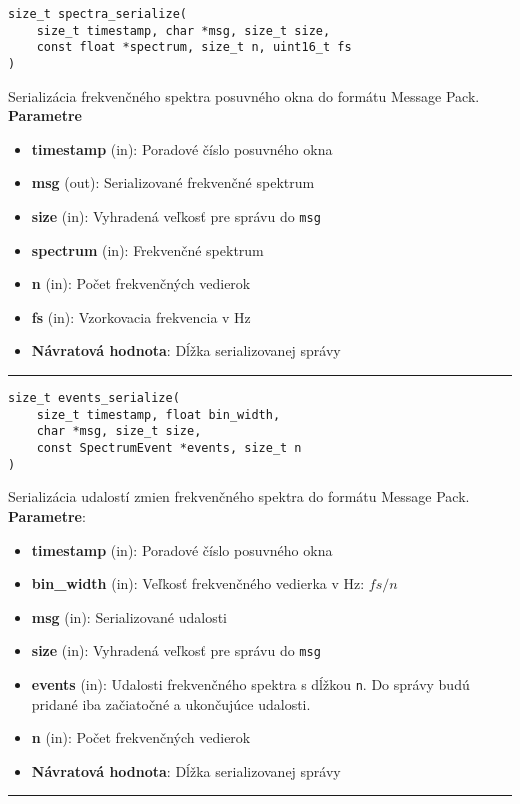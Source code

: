 \begin{lstlisting}[style=docs]
size_t spectra_serialize(
	size_t timestamp, char *msg, size_t size, 
	const float *spectrum, size_t n, uint16_t fs
)
\end{lstlisting}
Serializácia frekvenčného spektra posuvného okna do formátu Message Pack. \\ 
\textbf{Parametre}
\begin{itemize}[noitemsep, topsep=0pt]
 	\item \textbf{timestamp} (in): Poradové číslo posuvného okna
 	\item \textbf{msg} (out): Serializované frekvenčné spektrum
 	\item \textbf{size} (in): Vyhradená veľkosť pre správu do \verb|msg|
 	\item \textbf{spectrum} (in): Frekvenčné spektrum
	\item \textbf{n} (in): Počet frekvenčných vedierok
	\item \textbf{fs} (in): Vzorkovacia frekvencia v Hz
 	\item \textbf{Návratová hodnota}: Dĺžka serializovanej správy
\end{itemize}
\bigbreak
\hrule

\begin{lstlisting}[style=docs]
size_t events_serialize(
	size_t timestamp, float bin_width, 
	char *msg, size_t size, 
	const SpectrumEvent *events, size_t n
)
\end{lstlisting}
Serializácia udalostí zmien frekvenčného spektra do formátu Message Pack. \\ 
\textbf{Parametre}:
\begin{itemize}[noitemsep, topsep=0pt]
	\item \textbf{timestamp} (in): Poradové číslo posuvného okna
	\item \textbf{bin\_width} (in): Veľkosť frekvenčného vedierka v Hz: $fs / n$
	\item \textbf{msg} (in): Serializované udalosti
	\item \textbf{size} (in): Vyhradená veľkosť pre správu do  \verb|msg|
	\item \textbf{events} (in): Udalosti frekvenčného spektra s dĺžkou  \verb|n|. 
	Do správy budú pridané iba začiatočné a ukončujúce udalosti.
	\item \textbf{n} (in): Počet frekvenčných vedierok
	\item \textbf{Návratová hodnota}: Dĺžka serializovanej správy
\end{itemize}
\bigbreak
\hrule

